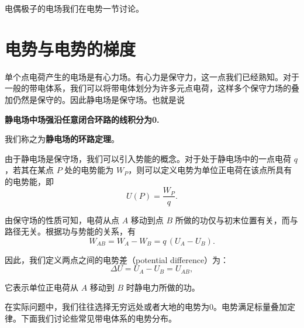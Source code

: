 \documentclass[12pt,a4paper,oneside]{report}
\theoremstyle{definition}
\theoremstyle{remark}
\begin{document}
电偶极子的电场我们在电势一节讨论。

\section{电势与电势的梯度}

单个点电荷产生的电场是有心力场。有心力是保守力，这一点我们已经熟知。对于一般的带电体系，我们可以将带电体划分为许多元点电荷，这样多个保守力场的叠加仍然是保守的。因此静电场是保守场。也就是说
\begin{center}
  \textbf{静电场中场强沿任意闭合环路的线积分为0.}
\end{center}

我们称之为\textbf{静电场的环路定理}。

由于静电场是保守场，我们可以引入势能的概念。对于处于静电场中的一点电荷 $q$，若其在某点 $P$ 处的电势能为 $W_P$，则可以定义电势为单位正电荷在该点所具有的电势能，即
\[
U(P)=\frac{W_P}{q}.
\]

由保守场的性质可知，电荷从点 $A$ 移动到点 $B$ 所做的功仅与初末位置有关，而与路径无关。根据功与势能的关系，有
\[
W_{AB} = W_A - W_B = q\,(U_A - U_B).
\]

因此，我们定义两点之间的电势差（potential difference）为：
\[
\Delta U = U_A - U_B = U_{AB},
\]

它表示单位正电荷从 $A$ 移动到 $B$ 时静电力所做的功。

在实际问题中，我们往往选择无穷远处或者大地的电势为0。电势满足标量叠加定律。下面我们讨论些常见带电体系的电势分布。
\end{document}
